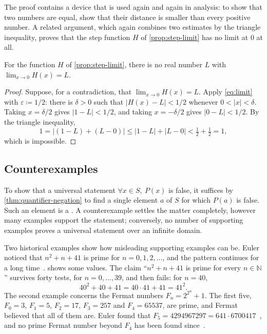 The proof contains a device that is used again and again in analysis: to show that two numbers are equal, show that their distance is smaller than every positive number. A related argument, which again combines two estimates by the triangle inequality, proves that the step function $H$ of \cref{prop:step-limit} has no limit at $0$ at all.

\begin{proposition}
\label{prop:step-no-limit}
For the function $H$ of \cref{prop:step-limit}, there is no real number $L$ with $\lim_{x\to0}H(x)=L$.
\end{proposition}

\begin{proof}
Suppose, for a contradiction, that $\lim_{x\to0}H(x)=L$. Apply \eqref{eq:limit} with $\varepsilon\coloneqq1/2$: there is $\delta>0$ such that $|H(x)-L|<1/2$ whenever $0<|x|<\delta$. Taking $x=\delta/2$ gives $|1-L|<1/2$, and taking $x=-\delta/2$ gives $|0-L|<1/2$. By the triangle inequality,
\[
1=|(1-L)+(L-0)|\le|1-L|+|L-0|<\tfrac12+\tfrac12=1,
\]
which is impossible.
\end{proof}

\subsection{Counterexamples}

To show that a universal statement $\forall x\in S,\ P(x)$ is false, it suffices by \cref{thm:quantifier-negation} to find a single element $a$ of $S$ for which $P(a)$ is false. Such an element is a . A counterexample settles the matter completely, however many examples support the statement; conversely, no number of supporting examples proves a universal statement over an infinite domain.

Two historical examples show how misleading supporting examples can be. Euler noticed that $n^2+n+41$ is prime for $n=0,1,2,\ldots$, and the pattern continues for a long time~\cite{ribenboim1996}.  shows some values. The claim ``$n^2+n+41$ is prime for every $n\in\mathbb N$'' survives forty tests, for $n=0,\ldots,39$, and then fails: for $n=40$,
\[
40^2+40+41=40\cdot41+41=41^2 .
\]
The second example concerns the Fermat numbers $F_n=2^{2^n}+1$. The first five, $F_0=3$, $F_1=5$, $F_2=17$, $F_3=257$ and $F_4=65537$, are prime, and Fermat believed that all of them are. Euler found that $F_5=4294967297=641\cdot6700417$~\cite{euler1738fermat}, and no prime Fermat number beyond $F_4$ has been found since~\cite{hardywright2008,ribenboim1996}.

